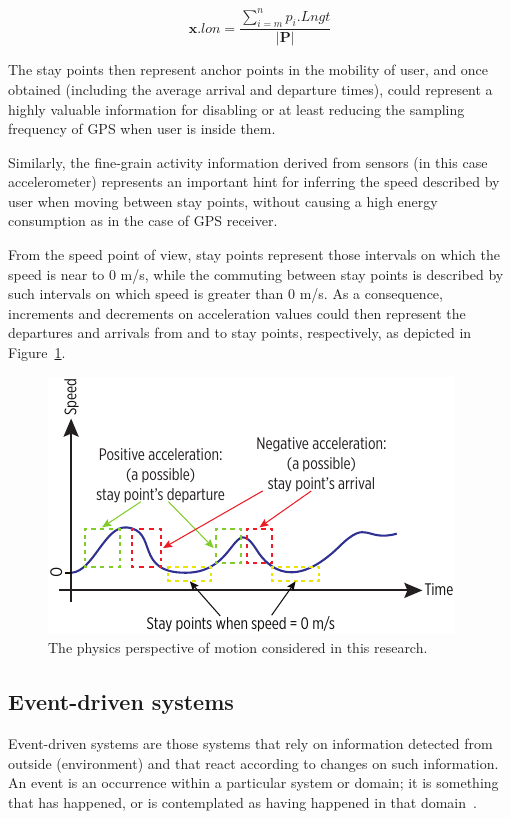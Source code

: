 \documentclass[ENG,PhD]{cinvestav}
\begin{document}
\begin{equation}
\mathbf{x}.lon = \frac{ \sum_{i=m}^{n}p_{i}.Lngt }{ |\mathbf{P}| }\label{eq:centroid-longitude}
\end{equation}

The stay points then represent anchor points in the mobility of user, and once obtained (including the average arrival and departure times), could represent a highly valuable information for disabling or at least reducing the sampling frequency of GPS when user is inside them.

Similarly, the fine-grain activity information derived from sensors (in this case accelerometer) represents an important hint for inferring the speed described by user when moving between stay points, without causing a high energy consumption as in the case of GPS receiver.

From the speed point of view, stay points represent those intervals on which the speed is near to 0 m/s, while the commuting between stay points is described by such intervals on which speed is greater than 0 m/s. 
As a consequence, increments and decrements on acceleration values could then represent the departures and arrivals from and to stay points, respectively, as depicted in Figure~\ref{fig:physics-perspective-of-motion}.

\begin{figure}
  \centering
  \includegraphics[]{vectors/physics-perspective-of-motion}
  \caption{The physics perspective of motion considered in this research.}
  \label{fig:physics-perspective-of-motion}
\end{figure}


\subsection{Event-driven systems}
Event-driven systems are those systems that rely on information detected from outside (environment) and that react according to changes on such information.
An event is an occurrence within a particular system or domain; it is something that has happened, or is contemplated as having happened in that domain~\cite{Etzion2011}.
\end{document}
